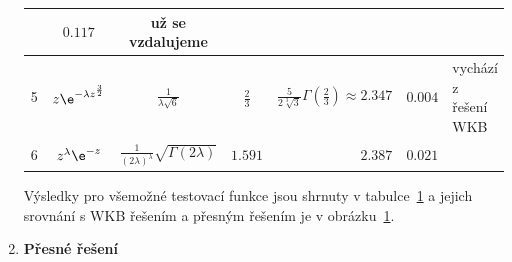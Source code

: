 \begin{solution}
\begin{enumerate}
\begin{table}[!htb]
\begin{tabular}{|c|c|c|c|r|c|l|}
                        & $0.117$
                        & už se vzdalujeme \\
                    \hline
                    5
                        & $z\e^{-\lambda z^{\frac{3}{2}}}$ 
                        & $\frac{1}{\lambda\sqrt{6}}$
                        & $\frac{2}{3}$ 
                        & $\frac{5}{2\sqrt[3]{3}}\Gamma\left(\frac{2}{3}\right)\approx2.347$
                        & $0.004$
                        & vychází z řešení WKB\\
                    \hline
                    6   
                        & $z^{\lambda}\e^{-z}$ 
                        & $\frac{1}{(2\lambda)^{\lambda}}\sqrt{\Gamma(2\lambda)}$
                        & $1.591$ 
                        & $2.387$
                        & $0.021$
                        & \\
                    \hline
                \end{tabular}
                \label{tab:vysledky}
            \end{table}

            \begin{figure}[!htbp]
                \centering{}
                \label{fig:variace}
            \end{figure}

            Výsledky pro všemožné testovací funkce jsou shrnuty v tabulce~\ref{tab:vysledky} a jejich srovnání s WKB řešením a přesným řešením je v obrázku~\ref{fig:variace}.

        \item \textbf{Přesné řešení}
        

\end{enumerate}
\end{solution}
